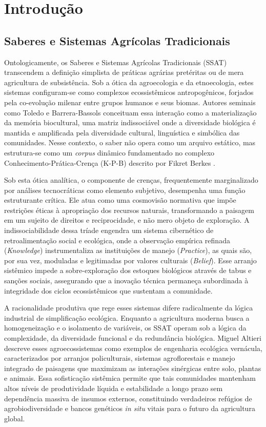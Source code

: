 \pagestyle{plain}
\chapter{Introdução}

\section{Saberes e Sistemas Agrícolas Tradicionais}

Ontologicamente, os Saberes e Sistemas Agrícolas Tradicionais (SSAT) transcendem a definição simplista de práticas agrárias pretéritas ou de mera agricultura de subsistência. Sob a ótica da agroecologia e da etnoecologia, estes sistemas configuram-se como complexos ecossistêmicos antropogênicos, forjados pela co-evolução milenar entre grupos humanos e seus biomas. Autores seminais como Toledo e Barrera-Bassols \cite{Toledo2008} conceituam essa interação como a materialização da memória biocultural, uma matriz indissociável onde a diversidade biológica é mantida e amplificada pela diversidade cultural, linguística e simbólica das comunidades. Nesse contexto, o saber não opera como um arquivo estático, mas estrutura-se como um \textit{corpus} dinâmico fundamentado no complexo Conhecimento-Prática-Crença (K-P-B) descrito por Fikret Berkes \cite{Berkes2017}.

Sob esta ótica analítica, o componente de crenças, frequentemente marginalizado por análises tecnocráticas como elemento subjetivo, desempenha uma função estruturante crítica. Ele atua como uma cosmovisão normativa que impõe restrições éticas à apropriação dos recursos naturais, transformando a paisagem em um sujeito de direitos e reciprocidade, e não mero objeto de exploração. A indissociabilidade dessa tríade engendra um sistema cibernético de retroalimentação social e ecológica, onde a observação empírica refinada (\textit{Knowledge}) instrumentaliza as instituições de manejo (\textit{Practice}), as quais são, por sua vez, moduladas e legitimadas por valores culturais (\textit{Belief}). Esse arranjo sistêmico impede a sobre-exploração dos estoques biológicos através de tabus e sanções sociais, assegurando que a inovação técnica permaneça subordinada à integridade dos ciclos ecossistêmicos que sustentam a comunidade.

A racionalidade produtiva que rege esses sistemas difere radicalmente da lógica industrial de simplificação ecológica. Enquanto a agricultura moderna busca a homogeneização e o isolamento de variáveis, os SSAT operam sob a lógica da complexidade, da diversidade funcional e da redundância biológica. Miguel Altieri \cite{Altieri1995} descreve esses agroecossistemas como exemplos de engenharia ecológica vernácula, caracterizados por arranjos policulturais, sistemas agroflorestais e manejo integrado de paisagens que maximizam as interações sinérgicas entre solo, plantas e animais. Essa sofisticação sistêmica permite que tais comunidades mantenham altos níveis de produtividade líquida e estabilidade a longo prazo sem dependência massiva de insumos externos, constituindo verdadeiros refúgios de agrobiodiversidade e bancos genéticos \textit{in situ} vitais para o futuro da agricultura global.

